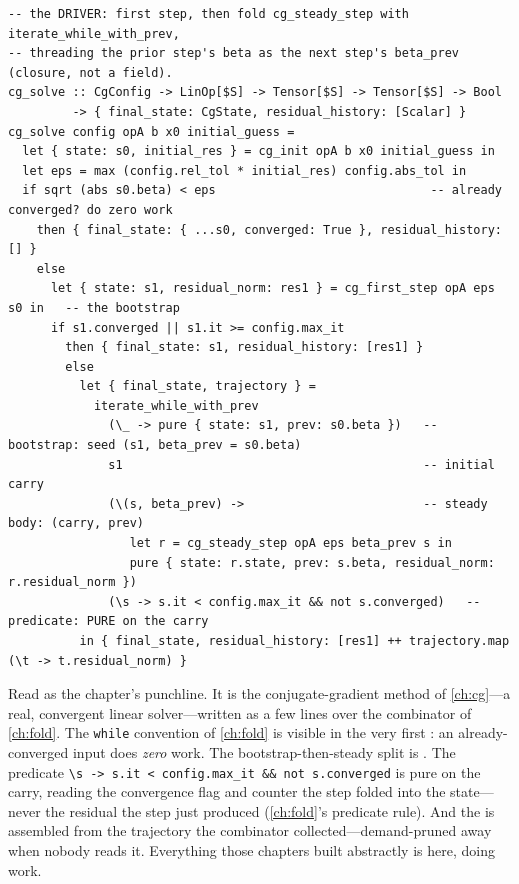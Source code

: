 \begin{lstlisting}[style=l4style]
-- the DRIVER: first step, then fold cg_steady_step with iterate_while_with_prev,
-- threading the prior step's beta as the next step's beta_prev (closure, not a field).
cg_solve :: CgConfig -> LinOp[$S] -> Tensor[$S] -> Tensor[$S] -> Bool
         -> { final_state: CgState, residual_history: [Scalar] }
cg_solve config opA b x0 initial_guess =
  let { state: s0, initial_res } = cg_init opA b x0 initial_guess in
  let eps = max (config.rel_tol * initial_res) config.abs_tol in
  if sqrt (abs s0.beta) < eps                              -- already converged? do zero work
    then { final_state: { ...s0, converged: True }, residual_history: [] }
    else
      let { state: s1, residual_norm: res1 } = cg_first_step opA eps s0 in   -- the bootstrap
      if s1.converged || s1.it >= config.max_it
        then { final_state: s1, residual_history: [res1] }
        else
          let { final_state, trajectory } =
            iterate_while_with_prev
              (\_ -> pure { state: s1, prev: s0.beta })   -- bootstrap: seed (s1, beta_prev = s0.beta)
              s1                                          -- initial carry
              (\(s, beta_prev) ->                         -- steady body: (carry, prev)
                 let r = cg_steady_step opA eps beta_prev s in
                 pure { state: r.state, prev: s.beta, residual_norm: r.residual_norm })
              (\s -> s.it < config.max_it && not s.converged)   -- predicate: PURE on the carry
          in { final_state, residual_history: [res1] ++ trajectory.map (\t -> t.residual_norm) }
\end{lstlisting}

\noindent Read  as the chapter's punchline. It is the
conjugate-gradient method of \cref{ch:cg}---a real, convergent linear solver---written
as a few lines over the combinator of \cref{ch:fold}. The \texttt{while} convention
of \cref{ch:fold} is visible in the very first : an already-converged input
does \emph{zero} work. The bootstrap-then-steady split is
. The predicate
\lstinline[style=l4style]|\s -> s.it < config.max_it && not s.converged| is pure on
the carry, reading the convergence flag and counter the step folded into the
state---never the residual the step just produced (\cref{ch:fold}'s predicate rule).
And the  is assembled from the trajectory the combinator
collected---demand-pruned away when nobody reads it. Everything those chapters built
abstractly is here, doing work.

